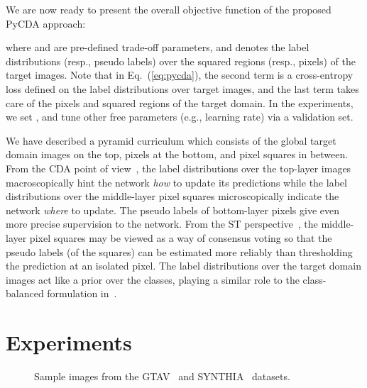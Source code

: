 \documentclass[10pt,twocolumn,letterpaper]{article}
\begin{document}
\vspace{3pt}
We are now ready to present the overall objective function of the proposed PyCDA approach:
\vspace{-0.2cm}

where  and  are pre-defined trade-off parameters, and  denotes the label distributions (resp., pseudo labels) over the squared regions (resp., pixels) of the target images. Note that in Eq.~(\ref{eq:pycda}), the second term is a cross-entropy loss defined on the label distributions over target images, and the last term takes care of the pixels and squared regions of the target domain. In the experiments, we set ,  and tune other free parameters (e.g., learning rate) via a validation set.

\vspace{3pt}
We have described a pyramid curriculum which consists of the global target domain images on the top, pixels at the bottom, and pixel squares in between. From the CDA point of view~\cite{curriculum_tpami}, the label distributions over the top-layer images macroscopically hint the network \emph{how} to update its predictions while the label distributions over the middle-layer
 pixel squares microscopically indicate the network \emph{where} to update. The pseudo labels of bottom-layer pixels give even more precise supervision to the network. From the ST perspective~\cite{self_motivated_2018_ECCV}, the middle-layer pixel squares may be viewed as a way of consensus voting so that the pseudo labels (of the squares) can be estimated more reliably than thresholding the prediction at an isolated pixel. The label distributions over the target domain images act like a prior over the classes, playing a similar role to the class-balanced formulation in~\cite{self_motivated_2018_ECCV}.


\section{Experiments}
\label{sec:dataset}

\begin{figure*}[ht]
\centering
{}\vspace{-0.4cm}
\qquad
\vspace{-0.2cm}
\caption{Sample images from the GTAV~\cite{gtav_2016_ECCV} and SYNTHIA~\cite{synthia_2016_CVPR} datasets.}\label{fig:synthetic-datasets}
\vspace{-0.2cm}
\end{figure*}
\label{sec:exp}
\end{document}
